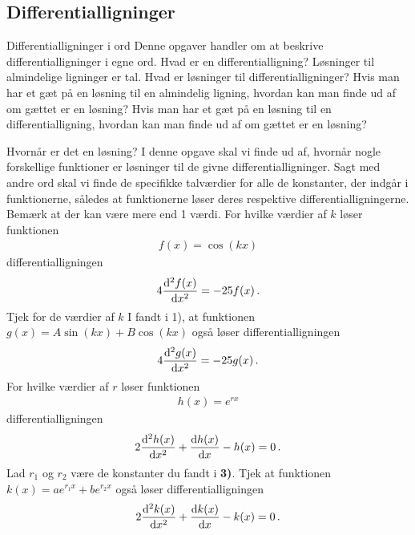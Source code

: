 \subsection*{Differentialligninger}
\begin{opgave}[1]{Differentialligninger i ord}
Denne opgaver handler om at beskrive differentialligninger i egne ord.
\opg Hvad er en differentialligning?
\opg Løsninger til almindelige ligninger er tal. Hvad er løsninger til differentialligninger?
\opg Hvis man har et gæt på en løsning til en almindelig ligning, hvordan kan man finde ud af om gættet er en løsning?
\opg Hvis man har et gæt på en løsning til en differentialligning, hvordan kan man finde ud af om gættet er en løsning?
\end{opgave}
\begin{opgave}[2]{Hvornår er det en løsning?}
	I denne opgave skal vi finde ud af, hvornår nogle forskellige funktioner er løsninger til de givne differentialligninger. Sagt med andre ord skal vi finde de specifikke talværdier for alle de konstanter, der indgår i funktionerne, således at funktionerne løser deres respektive differentialligningerne. Bemærk at der kan være mere end 1 værdi.
	\opg For hvilke værdier af $k$ løser funktionen
	\begin{align*}
	f(x) = \cos(kx)
	\end{align*}
	differentialligningen
	\begin{align*}
	4 \dv[2]{f(x)}{x} = - 25f(x) \, .
	\end{align*}
	\opg Tjek for de værdier af $k$ I fandt i 1), at funktionen $g(x) = A \sin (kx) + B \cos (kx)$ også løser differentialligningen
	\begin{align*}
	4 \dv[2]{g(x)}{x} = -25 g(x) \, .
	\end{align*}
	\opg For hvilke værdier af $r$ løser funktionen
	\begin{align*}
	h(x) = e^{rx}
	\end{align*}
	differentialligningen
	\begin{align*}
	2 \dv[2]{h(x)}{x} + \dv{h(x)}{x} - h(x) = 0 \, .
	\end{align*}
	\opg Lad $r_1$ og $r_2$ være de konstanter du fandt i \textbf{3)}. Tjek at funktionen $k (x) = ae^{r_1x} + be^{r_2x} $ også løser differentialligningen
	\begin{align*}
	2 \dv[2]{k(x)}{x} + \dv{k(x)}{x} - k(x) = 0 \, .
	\end{align*}
\end{opgave}
